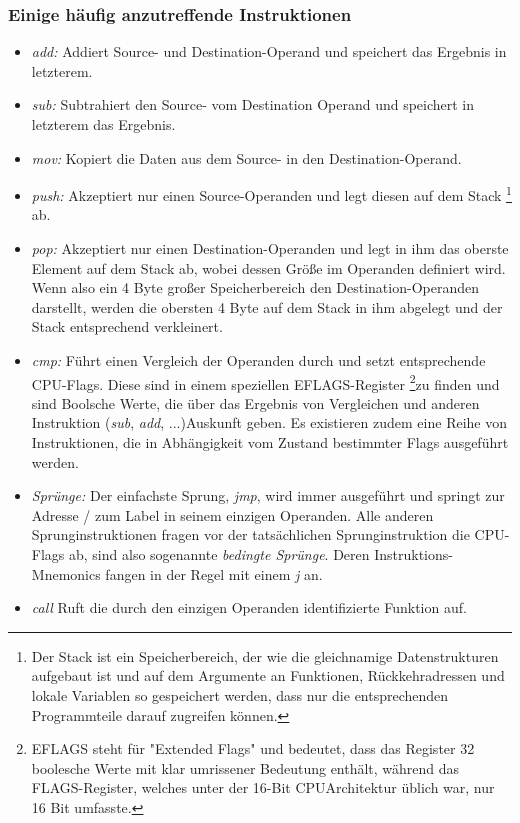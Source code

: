\documentclass[11pt]{article}
\begin{document}
\subsubsection{Einige häufig anzutreffende Instruktionen}
\begin{itemize}
	\item{\textit{add:}} Addiert Source- und Destination-Operand und speichert das Ergebnis in
		letzterem.
	\item{\textit{sub:}} Subtrahiert den Source- vom Destination Operand und speichert in letzterem
		das Ergebnis.
	\item{\textit{mov:}} Kopiert die Daten aus dem Source- in den Destination-Operand.
	\item{\textit{push:}} Akzeptiert nur einen Source-Operanden und legt diesen auf dem Stack
      \footnote{Der Stack ist ein Speicherbereich, der wie die gleichnamige Datenstrukturen aufgebaut
        ist und auf dem Argumente an Funktionen, Rückkehradressen und lokale Variablen so gespeichert
        werden, dass nur die entsprechenden Programmteile darauf zugreifen können.}
      ab.
	\item{\textit{pop:}} Akzeptiert nur einen Destination-Operanden und legt in ihm das oberste
		Element auf dem Stack ab, wobei dessen Größe im Operanden definiert wird.
		Wenn also ein 4 Byte großer Speicherbereich den Destination-Operanden darstellt,
		werden die obersten 4 Byte auf dem Stack in ihm abgelegt und der Stack
		entsprechend verkleinert.
	\item{\textit{cmp:}} Führt einen Vergleich der Operanden durch und setzt entsprechende
		CPU-Flags. Diese sind in einem speziellen EFLAGS-Register
		\footnote{
			EFLAGS steht für "Extended Flags" und bedeutet, dass das Register 32 boolesche
			Werte mit klar umrissener Bedeutung enthält, während das FLAGS-Register, welches
			unter der 16-Bit CPUArchitektur üblich war, nur 16 Bit umfasste.
		}zu finden und sind
		Boolsche Werte, die über das Ergebnis von Vergleichen und anderen Instruktion (\textit{sub},
		\textit{add}, ...)Auskunft geben. Es existieren zudem eine Reihe von Instruktionen,
		die in Abhängigkeit vom Zustand bestimmter Flags ausgeführt werden.
	\item{\textit{Sprünge:}} Der einfachste Sprung, \textit{jmp}, wird immer ausgeführt und
		springt zur Adresse / zum Label in seinem einzigen Operanden. Alle anderen
		Sprunginstruktionen fragen vor der tatsächlichen Sprunginstruktion die CPU-Flags ab,
		sind also sogenannte \textit{bedingte Sprünge}. Deren Instruktions-Mnemonics fangen
		in der Regel mit einem \textit{j} an.
	\item{\textit{call}} Ruft die durch den einzigen Operanden identifizierte Funktion auf.
\end{itemize}
\end{document}

